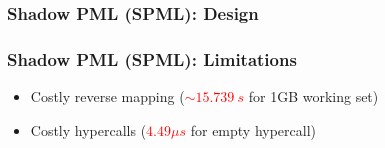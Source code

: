 \documentclass[xcolor=table,bigger,unknownkeysallowed]{beamer}
\newcommand{\myemph}[1]{\textcolor{red}{\bf #1}}
\begin{document}
\begin{frame}
	\frametitle{Shadow PML (SPML): Design}
		\begin{figure}
		\centering
		\end{figure}
\end{frame}
\begin{frame}
	\frametitle{Shadow PML (SPML): Limitations}
	\begin{overprint}

		\begin{itemize}
			\item Costly reverse mapping (\myemph{$\sim$$15.739 \: s$} for 1GB working set)
			\begin{figure}[!h]
			\end{figure}
			\vspace*{.5cm} 
			\item Costly hypercalls (\myemph{$4.49 \mu s$} for empty hypercall)
		\end{itemize}
~\\

	\end{overprint}
\end{frame}
\end{document}
